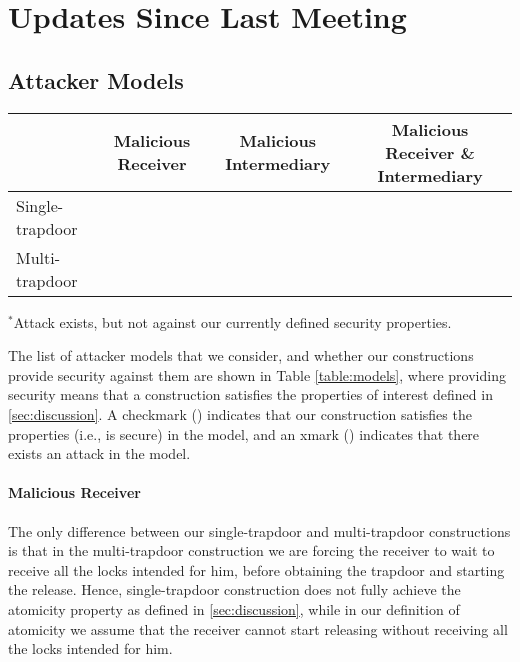 \section{Updates Since Last Meeting}

\subsection{Attacker Models}
\label{sec:attackermodels}

\begin{table*}[htb]
	\centering
	\begin{tabular}{|l|c|c|c|} \hline
		&	Malicious Receiver	&	Malicious Intermediary	&	Malicious Receiver \& Intermediary \\ \hline
		Single-trapdoor & \xmark & \xmark{$^*$} & \xmark \\ \hline
		Multi-trapdoor 	& \cmark & \cmark & \cmark \\ \hline
	\end{tabular}
	
	{\footnotesize $^*$Attack exists, but not against our currently defined security properties.}
	\caption{Attack models against our constructions.}
	\label{table:models}
\end{table*}

The list of attacker models that we consider, and whether our constructions provide security 
against them are shown in Table \ref{table:models}, where providing security means that 
a construction satisfies the properties of interest defined in \cref{sec:discussion}. 
A checkmark (\cmark) indicates that our construction satisfies the properties (i.e., is secure) 
in the model, and an xmark (\xmark) indicates that there exists an attack in the model.

\paragraph{Malicious Receiver} The only difference between our single-trapdoor and 
multi-trapdoor constructions is that in the multi-trapdoor construction we are forcing 
the receiver to wait to receive all the locks intended for him, before obtaining the 
trapdoor and starting the release. Hence, single-trapdoor construction does not fully 
achieve the atomicity property as defined in \cref{sec:discussion}, while in our definition 
of atomicity we assume that the receiver cannot start releasing without receiving all the 
locks intended for him.

